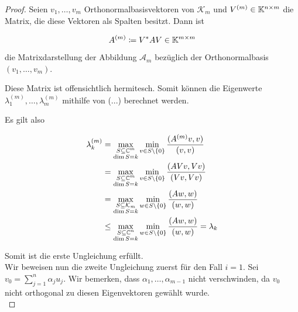 \documentclass{article}
\begin{document}
\begin{theorem}
\begin{proof}
	Seien $v_1, \dots, v_m$ Orthonormalbasisvektoren von $\mathcal{K}_m$ und $V^{(m)} \in \mathbb{K}^{n\times m}$ die Matrix, die diese Vektoren als Spalten besitzt. Dann ist 
	
	\begin{equation*}
		A^{(m)} \coloneqq V^* A V \in \mathbb{K}^{m\times m}
	\end{equation*}

	die Matrixdarstellung der Abbildung $\mathcal{A}_m$ bezüglich der Orthonormalbasis $(v_1,\dots,v_m)$.
	
	Diese Matrix ist offensichtlich hermitesch. Somit können die Eigenwerte $\lambda_1^{(m)}, \dots, \lambda_m^{(m)}$ mithilfe von (...) berechnet werden.
	
	Es gilt also
	
	\begin{equation}
		\label{Eigenwert_Ungl}
		\begin{aligned}
			\lambda_k^{(m)} &= \max_{\substack{S \subseteq \mathbb{C}^m\\ \dim S = k}} \min_{v\in S\setminus\{0\}} \frac{(A^{(m)}v,v)}{(v,v)} \\
			&= \max_{\substack{S \subseteq \mathbb{C}^m\\ \dim S = k}} \min_{v\in S\setminus\{0\}} \frac{(AVv,Vv)}{(Vv,Vv)}\\
			&= \max_{\substack{S \subseteq \mathcal{K}_m\\ \dim S = k}} \min_{w\in S\setminus\{0\}} \frac{(Aw,w)}{(w,w)}\\
			 &\le \max_{\substack{S \subseteq \mathbb{C}^n\\ \dim S = k}} \min_{w\in S\setminus\{0\}} \frac{(Aw,w)}{(w,w)} = \lambda_k
		\end{aligned}
	\end{equation}
	
	Somit ist die erste Ungleichung erfüllt.\\
	
	Wir beweisen nun die zweite Ungleichung zuerst für den Fall $i = 1$.
	Sei $v_0 = \sum_{j=1}^{n}\alpha_j u_j$. Wir bemerken, dass $\alpha_1, \dots, \alpha_{m-1}$ nicht verschwinden, da $v_0$ nicht orthogonal zu diesen Eigenvektoren gewählt wurde.\\
	

\end{proof}
\end{theorem}
\end{document}
